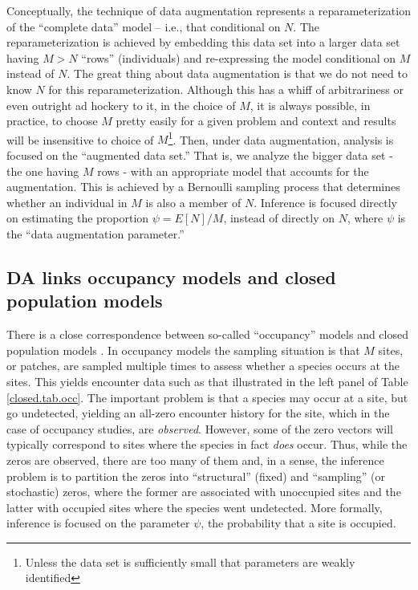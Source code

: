 Conceptually, the technique of data augmentation represents a
reparameterization of the ``complete data'' model -- i.e., that
conditional on $N$. The reparameterization is achieved by embedding
this data set into a larger data set having $M> N$ ``rows''
(individuals) and re-expressing the model conditional on $M$ instead
of $N$. The great thing about data augmentation is that we do not need
to know $N$ for this reparameterization.  Although this has a whiff of
arbitrariness or even outright ad hockery to it, in the choice of $M$,
it is always possible, in practice, to choose $M$ pretty easily for a
given problem and context and results will be insensitive to choice of
$M$\footnote{Unless the data set is sufficiently small that parameters
  are weakly identified}.  Then, under data augmentation, analysis is
focused on the ``augmented data set.'' That is, we analyze the bigger
data set - the one having $M$ rows - with an appropriate model that
accounts for the augmentation. This is achieved by a Bernoulli
sampling process that determines whether an individual in $M$ is also
a member of $N$.  Inference is focused directly on estimating the
proportion $\psi = E[N]/M$, instead of directly on $N$, where $\psi$
is the ``data augmentation parameter.''


\subsection{DA links occupancy models and closed population models}


There is a close correspondence between so-called ``occupancy'' models and closed
population models \citep[see][Sec. 5.6]{royle_dorazio:2008}.
In occupancy models \citep{mackenzie_etal:2002, tyre_etal:2003} the
sampling situation is that $M$ sites, or patches, are sampled multiple
times to assess whether a species occurs at the sites.  This yields
encounter data such as that illustrated in the left panel of Table
\ref{closed.tab.occ}. The important problem is that a species may
occur at a site, but go undetected, yielding an all-zero encounter
history for the site, which in the case of occupancy studies, are {\it
  observed}. However, some of the zero vectors will typically correspond
to sites where the species in fact {\it does} occur. Thus, while the
zeros are observed, there are too many of them and, in a sense, the
inference problem is to partition the zeros into ``structural''
(fixed) and ``sampling'' (or stochastic) zeros, where the former are
associated with unoccupied sites and the latter with occupied sites where
the species went undetected. More
formally, inference is focused on the parameter $\psi$, the
probability that a site is occupied.

